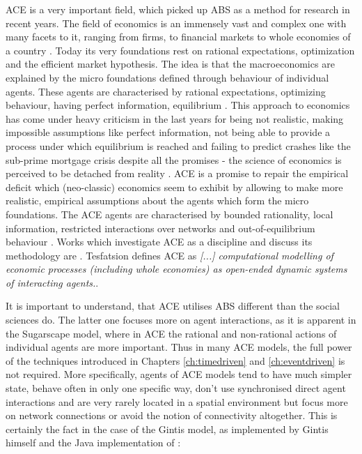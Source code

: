 ACE is a very important field, which picked up ABS as a method for research in recent years. The field of economics is an immensely vast and complex one with many facets to it, ranging from firms, to financial markets to whole economies of a country \cite{bowles_understanding_2005}. Today its very foundations rest on rational expectations, optimization and the efficient market hypothesis. The idea is that the macroeconomics are explained by the micro foundations \cite{colell_microeconomic_1995} defined through behaviour of individual agents. These agents are characterised by rational expectations, optimizing behaviour, having perfect information, equilibrium \cite{focardi_is_2015}.
This approach to economics has come under heavy criticism in the last years for being not realistic, making impossible assumptions like perfect information, not being able to provide a process under which equilibrium is reached \cite{kirman_complex_2010} and failing to predict crashes like the sub-prime mortgage crisis despite all the promises - the science of economics is perceived to be detached from reality \cite{focardi_is_2015}. 
ACE is a promise to repair the empirical deficit which (neo-classic) economics seem to exhibit by allowing to make more realistic, empirical assumptions about the agents which form the micro foundations. The ACE agents are characterised by bounded rationality, local information, restricted interactions over networks and out-of-equilibrium behaviour \cite{farmer_economy_2009}. 
Works which investigate ACE as a discipline and discuss its methodology are \cite{ballot_agent-based_2015,blume_introduction_2015,richiardi_agent-based_2007,tesfatsion_agent-based_2006}.
Tesfatsion \cite{tesfatsion_agent-based_2017} defines ACE as \textit{[...] computational modelling of economic processes (including whole economies) as open-ended dynamic systems of interacting agents.}. 

It is important to understand, that ACE utilises ABS different than the social sciences do. The latter one focuses more on agent interactions, as it is apparent in the Sugarscape model, where in ACE the rational and non-rational actions of individual agents are more important. Thus in many ACE models, the full power of the techniques introduced in Chapters \ref{ch:timedriven} and \ref{ch:eventdriven} is not required. More specifically, agents of ACE models tend to have much simpler state, behave often in only one specific way, don't use synchronised direct agent interactions and are very rarely located in a spatial environment but focus more on network connections \cite{glasserman_contagion_2015,wilhite_economic_2006} or avoid the notion of connectivity altogether. This is certainly the fact in the case of the Gintis model, as implemented by Gintis himself and the Java implementation of \cite{evensen_extensible_2010}: 

